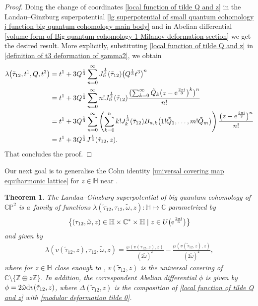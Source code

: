 \documentclass[11pt]{article}
\numberwithin{equation}{section}
\numberwithin{equation}{section}
\newtheorem{Theorem}{Theorem}[section]
\begin{document}
\begin{proof}
Doing the change of coordinates \eqref{local function of tilde Q and z} in the Landau--Ginzburg superpotential \eqref{lg superpotential of small quantum cohomology j function big quantum cohomology main body} and in Abelian differential \eqref{volume form of Big quantum cohomology 1 Milanov deformation section} we get the desired result. More explicitly, substituting \eqref{local function of tilde Q and z} in \eqref{definition of t3 deformation of gamma2}, we obtain
\begin{align}
\lambda\bigl(\tilde\tau_{12},t^1,Q,t^3\bigr)&=t^1+3Q^{\frac{1}{3}}\sum_{n=0}^{\infty}J_n^{\frac{1}{3}}(\tilde\tau_{12})\bigl( Q^{\frac{1}{3}}t^3\bigr)^n\nonumber\\
&=t^1+3Q^{\frac{1}{3}}\sum_{n=0}^{\infty}n!J_n^{\frac{1}{3}}(\tilde\tau_{12})\frac{\bigl( \sum_{k=0}^{\infty}\tilde Q_k \bigl(z-{\rm e}^{\frac{2\pi {\rm i}}{3}} \bigr)^k \bigr)^n}{n!}\nonumber\\
&=t^1+3Q^{\frac{1}{3}}\sum_{n=0}^{\infty}\left( \sum_{k=0}^{n} k! J_k^{\frac{1}{3}}(\tilde\tau_{12}) B_{n,k}\bigl(1!\tilde Q_1,\dots,m!\tilde Q_m\bigr) \right)\frac{\bigl(z-{\rm e}^{\frac{2\pi {\rm i}}{3}} \bigr)^n}{n!}\nonumber\\
&=t^1+3Q^{\frac{1}{3}}J^{\frac{1}{3}}(\tilde\tau_{12},z).\label{Lg superpotential big quantum cohomology geo iso dif 12}
\end{align}
That concludes the proof.
\end{proof}

Our next goal is to generalise the Cohn identity \eqref{universal covering map equiharmonic lattice} for $z \in \mathbb{H}$ near .

\begin{Theorem}
The Landau--Ginzburg superpotential of big quantum cohomology of $\mathbb{CP}^2$ is a~family of functions
$
\lambda(\tilde\tau_{12}, \tau_{12}, \tilde\omega,z)\colon \mathbb{H} \mapsto \mathbb{C}
$
parametrized by
\begin{gather*}
\bigl\{(\tau_{12},\tilde\omega,z) \in \mathbb{H}\times\mathbb{C}^{*}\times\mathbb{H}\mid z \in U\bigl({\rm e}^{\frac{2\pi {\rm i}}{3}}\bigr) \bigr\}
\end{gather*}
and given by
\begin{gather*}
\lambda(v(\tilde\tau_{12},z),\tau_{12},\tilde\omega,z)=\frac{\wp(v(\tau_{12},z),z)}{\left(2\tilde\omega\right)^2}-\frac{\wp(v(\tilde\tau_{12},z),z)}{\left(2\tilde\omega\right)^2},
\end{gather*}
where for $z\in \mathbb{H}$ close enough to , $v(\tilde\tau_{12},z)$ is the universal covering of $\mathbb{C}\setminus\{\mathbb{Z}\oplus z\mathbb{Z} \}$.
 In addition, the correspondent Abelian differential $\phi$ is given by
$
\phi= 2\tilde\omega {\rm d}v(\tilde\tau_{12},z)$,
where $\Delta(\tilde\tau_{12},z)$ is the composition of \eqref{local function of tilde Q and z} with \eqref{modular deformation tilde 0}.
\end{Theorem}
\end{document}
